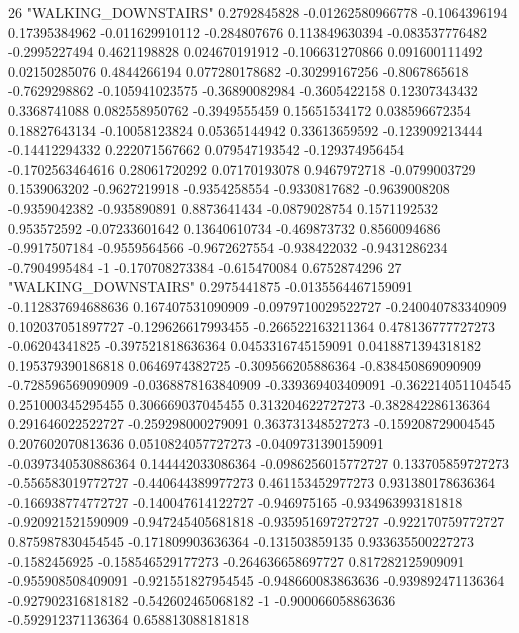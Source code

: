 26 "WALKING_DOWNSTAIRS" 0.2792845828 -0.01262580966778 -0.1064396194 0.17395384962 -0.011629910112 -0.284807676 0.113849630394 -0.083537776482 -0.2995227494 0.4621198828 0.024670191912 -0.106631270866 0.091600111492 0.02150285076 0.4844266194 0.077280178682 -0.30299167256 -0.8067865618 -0.7629298862 -0.105941023575 -0.36890082984 -0.3605422158 0.12307343432 0.3368741088 0.082558950762 -0.3949555459 0.15651534172 0.038596672354 0.18827643134 -0.10058123824 0.05365144942 0.33613659592 -0.123909213444 -0.14412294332 0.222071567662 0.079547193542 -0.129374956454 -0.1702563464616 0.28061720292 0.07170193078 0.9467972718 -0.0799003729 0.1539063202 -0.9627219918 -0.9354258554 -0.9330817682 -0.9639008208 -0.9359042382 -0.935890891 0.8873641434 -0.0879028754 0.1571192532 0.953572592 -0.07233601642 0.13640610734 -0.469873732 0.8560094686 -0.9917507184 -0.9559564566 -0.9672627554 -0.938422032 -0.9431286234 -0.7904995484 -1 -0.170708273384 -0.615470084 0.6752874296
27 "WALKING_DOWNSTAIRS" 0.2975441875 -0.0135564467159091 -0.112837694688636 0.167407531090909 -0.0979710029522727 -0.240040783340909 0.102037051897727 -0.129626617993455 -0.266522163211364 0.478136777727273 -0.06204341825 -0.397521818636364 0.0453316745159091 0.0418871394318182 0.195379390186818 0.0646974382725 -0.309566205886364 -0.838450869090909 -0.728596569090909 -0.0368878163840909 -0.339369403409091 -0.362214051104545 0.251000345295455 0.306669037045455 0.313204622727273 -0.382842286136364 0.291646022522727 -0.259298000279091 0.363731348527273 -0.159208729004545 0.207602070813636 0.0510824057727273 -0.0409731390159091 -0.0397340530886364 0.144442033086364 -0.0986256015772727 0.133705859727273 -0.556583019772727 -0.440644389977273 0.461153452977273 0.931380178636364 -0.166938774772727 -0.140047614122727 -0.946975165 -0.934963993181818 -0.920921521590909 -0.947245405681818 -0.935951697272727 -0.922170759772727 0.875987830454545 -0.171809903636364 -0.131503859135 0.933635500227273 -0.1582456925 -0.158546529177273 -0.264636658697727 0.817282125909091 -0.955908508409091 -0.921551827954545 -0.948660083863636 -0.939892471136364 -0.927902316818182 -0.542602465068182 -1 -0.900066058863636 -0.592912371136364 0.658813088181818
